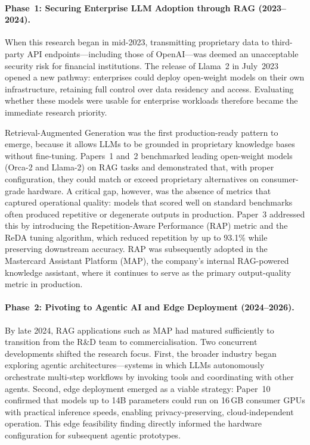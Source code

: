 \paragraph{Phase~1: Securing Enterprise LLM Adoption through RAG (2023--2024).}
When this research began in mid-2023, transmitting proprietary data to third-party API endpoints---including those of OpenAI---was deemed an unacceptable security risk for financial institutions.  The release of Llama~2 in July~2023 opened a new pathway: enterprises could deploy open-weight models on their own infrastructure, retaining full control over data residency and access.  Evaluating whether these models were usable for enterprise workloads therefore became the immediate research priority.

Retrieval-Augmented Generation was the first production-ready pattern to emerge, because it allows LLMs to be grounded in proprietary knowledge bases without fine-tuning.  Papers~1 and~2 benchmarked leading open-weight models (Orca-2 and Llama-2) on RAG tasks and demonstrated that, with proper configuration, they could match or exceed proprietary alternatives on consumer-grade hardware.  A critical gap, however, was the absence of metrics that captured operational quality: models that scored well on standard benchmarks often produced repetitive or degenerate outputs in production.  Paper~3 addressed this by introducing the Repetition-Aware Performance (RAP) metric and the ReDA tuning algorithm, which reduced repetition by up to 93.1\% while preserving downstream accuracy.  RAP was subsequently adopted in the Mastercard Assistant Platform (MAP), the company's internal RAG-powered knowledge assistant, where it continues to serve as the primary output-quality metric in production.

\paragraph{Phase~2: Pivoting to Agentic AI and Edge Deployment (2024--2026).}
By late 2024, RAG applications such as MAP had matured sufficiently to transition from the R\&D team to commercialisation.  Two concurrent developments shifted the research focus.  First, the broader industry began exploring agentic architectures---systems in which LLMs autonomously orchestrate multi-step workflows by invoking tools and coordinating with other agents.  Second, edge deployment emerged as a viable strategy: Paper~10 confirmed that models up to 14B parameters could run on 16\,GB consumer GPUs with practical inference speeds, enabling privacy-preserving, cloud-independent operation.  This edge feasibility finding directly informed the hardware configuration for subsequent agentic prototypes.

